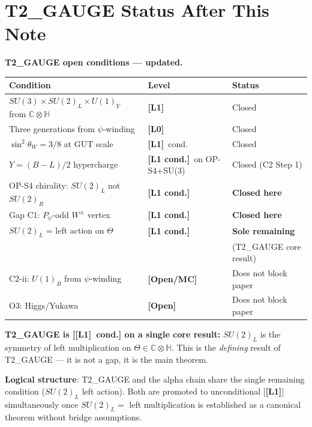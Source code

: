 \documentclass[12pt,a4paper]{article}
\theoremstyle{remark}\newtheorem{remark}[theorem]{Remark}
\newcommand{\Lz}{\textbf{[L0]}}
\newcommand{\Lo}{\textbf{[L1]}}
\newcommand{\Lc}{\textbf{[L1 cond.]}}
\begin{document}
\section{T2\_GAUGE Status After This Note}
\label{sec:status}

\begin{resultbox}
\textbf{T2\_GAUGE open conditions — updated.}

\begin{center}
\renewcommand{\arraystretch}{1.25}\footnotesize
\begin{tabular}{p{6cm}p{2.8cm}p{3.5cm}}
\toprule
Condition & Level & Status \\
\midrule
$SU(3)\times SU(2)_L\times U(1)_Y$ from $\mathbb{C}\otimes\mathbb{H}$ & \Lo & Closed \\
Three generations from $\psi$-winding & \Lz & Closed \\
$\sin^2\theta_W=3/8$ at GUT scale & \Lo\ cond. & Closed \\
$Y=(B-L)/2$ hypercharge & \Lc\ on OP-S4+SU(3) & Closed (C2 Step 1) \\
OP-S4 chirality: $SU(2)_L$ not $SU(2)_R$ & \Lc & \textbf{Closed here} \\
Gap C1: $P_\psi$-odd $W^\pm$ vertex & \Lc & \textbf{Closed here} \\
\midrule
$SU(2)_L$ = left action on $\Theta$ & \Lc & \textbf{Sole remaining} \\
& & (T2\_GAUGE core result) \\
\midrule
C2-ii: $U(1)_B$ from $\psi$-winding & \textbf{[Open/MC]} & Does not block paper \\
O3: Higgs/Yukawa & \textbf{[Open]} & Does not block paper \\
\bottomrule
\end{tabular}
\end{center}

\medskip
\textbf{T2\_GAUGE is [\Lo\ cond.] on a single core result:}
$SU(2)_L$ is the symmetry of left multiplication on $\Theta\in\mathbb{C}\otimes\mathbb{H}$.
This is the \emph{defining} result of T2\_GAUGE — it is not a gap,
it is the main theorem.

\medskip
\textbf{Logical structure}: T2\_GAUGE and the alpha chain share
the single remaining condition ($SU(2)_L$ left action).
Both are promoted to unconditional [\Lo] simultaneously once
$SU(2)_L=$ left multiplication is established as a canonical theorem
without bridge assumptions.
\end{resultbox}
\end{document}
